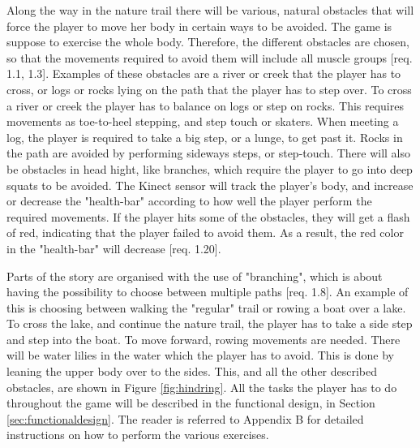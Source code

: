 Along the way in the nature trail there will be various, natural obstacles that will force the player to move her body in certain ways to be avoided. The game is suppose to exercise the whole body. Therefore, the different obstacles are chosen, so that the movements required to avoid them will include all muscle groups [req. 1.1, 1.3]. Examples of these obstacles are a river or creek that the player has to cross, or logs or rocks lying on the path that the player has to step over. To cross a river or creek the player has to balance on logs or step on rocks. This requires movements as toe-to-heel stepping, and step touch or skaters. When meeting a log, the player is required to take a big step, or a lunge, to get past it. Rocks in the path are avoided by performing sideways steps, or step-touch. There will also be obstacles in head hight, like branches, which require the player to go into deep squats to be avoided. The Kinect sensor will track the player's body, and increase or decrease the "health-bar" according to how well the player perform the required movements. If the player hits some of the obstacles, they will get a flash of red, indicating that the player failed to avoid them. As a result, the red color in the "health-bar" will decrease [req. 1.20].

Parts of the story are organised with the use of "branching", which is about having the possibility to choose between multiple paths [req. 1.8]. An example of this is choosing between walking the "regular" trail or rowing a boat over a lake. To cross the lake, and continue the nature trail, the player has to take a side step and step into the boat. To move forward, rowing movements are needed. There will be water lilies in the water which the player has to avoid. This is done by leaning the upper body over to the sides. This, and all the other described obstacles, are shown in Figure \ref{fig:hindring}. All the tasks the player has to do throughout the game will be described in the functional design, in Section \ref{sec:functionaldesign}. The reader is referred to Appendix B for detailed instructions on how to perform the various exercises.

